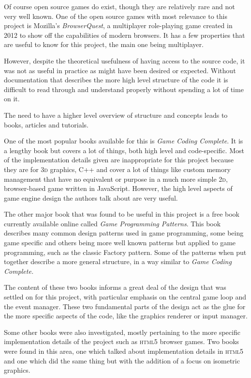 Of course open source games do exist, though they are relatively rare and not very well known. One of the open source games with most relevance to this project is Mozilla's \textit{BrowserQuest}\cite{citeulike:13139186, citeulike:13139189, citeulike:13139194}, a multiplayer role-playing game created in 2012 to show off the capabilities of modern browsers. It has a few properties that are useful to know for this project, the main one being multiplayer.

However, despite the theoretical usefulness of having access to the source code, it was not as useful in practice as might have been desired or expected. Without documentation that describes the more high level structure of the code it is difficult to read through and understand properly without spending a lot of time on it.

The need to have a higher level overview of structure and concepts leads to books, articles and tutorials.

One of the most popular books available for this is \textit{Game Coding Complete}\cite{citeulike:12394552}. It is a lengthy book but covers a lot of things, both high level and code-specific. Most of the implementation details given are inappropriate for this project because they are for \textsc{3d} graphics, C++ and cover a lot of things like custom memory management that have no equivalent or purpose in a much more simple \textsc{2d}, browser-based game written in JavaScript. However, the high level aspects of game engine design the authors talk about are very useful.

The other major book that was found to be useful in this project is a free book currently available online called \textit{Game Programming Patterns}\cite{citeulike:13049596}. This book describes many common design patterns used in game programming, some being game specific and others being more well known patterns but applied to game programming, such as the classic Factory pattern. Some of the patterns when put together describe a more general structure, in a way similar to \textit{Game Coding Complete.}

The content of these two books informs a great deal of the design that was settled on for this project, with particular emphasis on the central game loop and the event manager. These two fundamental parts of the design act as the glue for the more specific aspects of the code, like the graphics renderer or input manager.

Some other books were also investigated, mostly pertaining to the more specific implementation details of the project such as \textsc{html5} browser games. Two books were found in this area, one which talked about implementation details in \textsc{html5}\cite{citeulike:13000145} and one which did the same thing but with the addition of a focus on isometric graphics\cite{citeulike:13000170}.

